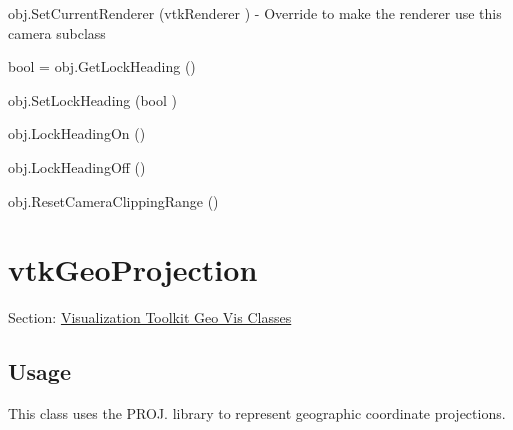 \begin{DoxyItemize}
\item {\ttfamily obj.\-Set\-Current\-Renderer (vtk\-Renderer )} -\/ Override to make the renderer use this camera subclass  
\item {\ttfamily bool = obj.\-Get\-Lock\-Heading ()}  
\item {\ttfamily obj.\-Set\-Lock\-Heading (bool )}  
\item {\ttfamily obj.\-Lock\-Heading\-On ()}  
\item {\ttfamily obj.\-Lock\-Heading\-Off ()}  
\item {\ttfamily obj.\-Reset\-Camera\-Clipping\-Range ()}  
\end{DoxyItemize}\hypertarget{vtkgeovis_vtkgeoprojection}{}\section{vtk\-Geo\-Projection}\label{vtkgeovis_vtkgeoprojection}
Section\-: \hyperlink{sec_vtkgeovis}{Visualization Toolkit Geo Vis Classes} \hypertarget{vtkwidgets_vtkxyplotwidget_Usage}{}\subsection{Usage}\label{vtkwidgets_vtkxyplotwidget_Usage}
This class uses the P\-R\-O\-J. library to represent geographic coordinate projections.

